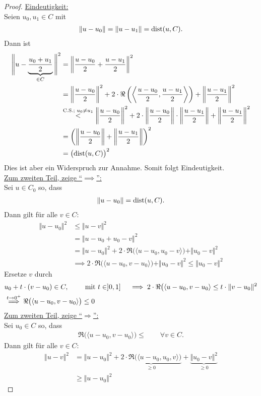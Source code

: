 \begin{proof}
\underline{Eindeutigkeit:}\\
Seien $u_0,u_1\in C$ mit
\begin{align*}
\Vert u-u_0\Vert=\Vert u-u_1\Vert=\dist(u,C).
\end{align*}
Dann ist 
\begin{align*}
\Bigg\Vert u-\underbrace{\frac{u_0+u_1}{2}}_{\in C}\Bigg\Vert^2
&=
\left\Vert\frac{u-u_0}{2}+\frac{u-u_1}{2}\right\Vert^2\\
&=\left\Vert\frac{u-u_0}{2}\right\Vert^2+2\cdot\Re\left(\left\langle\frac{u-u_0}{2},\frac{u-u_1}{2}\right\rangle\right)+\left\Vert\frac{u-u_1}{2}\right\Vert^2\\
&\stackrel{\text{C.S.; }u_0\neq u_1}{<}
\left\Vert\frac{u-u_0}{2}\right\Vert^2+2\cdot\left\Vert\frac{u-u_0}{2}\right\Vert\cdot\left\Vert\frac{u-u_1}{2}\right\Vert+\left\Vert\frac{u-u_1}{2}\right\Vert^2\\
&=
\left(\left\Vert\frac{u-u_0}{2}\right\Vert+\left\Vert\frac{u-u_1}{2}\right\Vert\right)^2\\
&=
\big(\dist(u,C)\big)^2
\end{align*}
Dies ist aber ein Widerspruch zur Annahme. Somit folgt Eindeutigkeit.\\
\underline{Zum zweiten Teil, zeige ``$\implies$'':}\\
Sei $u\in C_0$ so, dass 
\begin{align*}
\Vert u-u_0\Vert=\dist(u,C).
\end{align*}
Dann gilt für alle $v\in C$:
\begin{align*}
\Vert u-u_0\Vert^2 
&\leq
\Vert u-v\Vert^2\\
&=\Vert u-u_0+u_0-v\Vert^2\\
&=\Vert u-u_0\Vert^2+2\cdot\Re\big(\langle u-u_0, u_0-v\rangle\big)+\Vert u_0-v\Vert^2\\
&\implies
2\cdot\Re\big(\langle u-u_0, v-u_0\rangle\big)+\Vert u_0-v\Vert^2
\leq\Vert u_0-v\Vert^2
\end{align*}
Ersetze $v$ durch
\begin{align*}
&u_0+t\cdot(v-u_0)\in C,\qquad\mit t\in]0,1]\
&\implies
2\cdot\Re\big(\langle u-u_0,v-u_0\rangle\leq t\cdot\Vert v-u_0\Vert^2\\
&\stackrel{t\to 0^+}{\implies}
\Re\big(\langle u-u_0,v-u_0\rangle\big)\leq0
\end{align*}
\underline{Zum zweiten Teil, zeige ``$\Longrightarrow$'':}\\
Sei $u_0\in C$ so, dass 
\begin{align*}
\Re\big(\langle u-u_0,v-u_0\rangle\big)\leq\qquad\forall v\in C.
\end{align*}
Dann gilt für alle $v\in C$:
\begin{align*}
\Vert u-v\Vert^2
&=\Vert u-u_0\Vert^2+\underbrace{2\cdot\Re\big(\langle u-u_0,u_0,v\rangle\big)}_{\geq0}+\underbrace{\Vert u_0-v\Vert^2}_{\geq0}\\
&\geq
\Vert u-u_0\Vert^2
\end{align*}
\end{proof}


